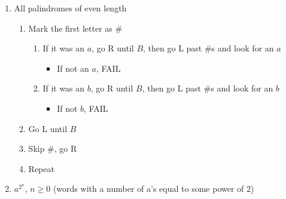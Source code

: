 \documentclass[12pt]{scrbook}
\begin{document}
\begin{enumerate}
      \begin{enumerate}
        \item All palindromes of even length

          \begin{enumerate}
            \item Mark the first letter as \#
              \begin{enumerate}
                \item If it was an $a$, go R until $B$, then go L past \#s
                  and look for an $a$
                  \begin{itemize}
                    \item If not an $a$, FAIL
                  \end{itemize}
                \item If it was an $b$, go R until $B$, then go L past \#s
                  and look for an $b$
                  \begin{itemize}
                    \item If not $b$, FAIL
                  \end{itemize}
              \end{enumerate}
            \item Go L until $B$
            \item Skip \#, go R
            \item Repeat
          \end{enumerate}

        \item $a^{2^n}$, $n \geq 0$ (words with a number of a's equal to some power of 2)


\end{enumerate}
\end{enumerate}
\end{document}
